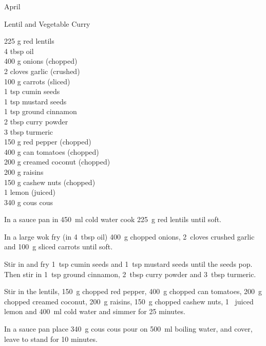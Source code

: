 \begin{menu}{April}
    \begin{recipe}{2}{Lentil and Vegetable Curry}%
		\begin{ingredients}
		225 g red lentils  \\
	4 tbsp oil  \\
	400 g onions (chopped) \\
	2 cloves garlic (crushed) \\
	100 g carrots (sliced) \\
	1 tsp cumin seeds  \\
	1 tsp mustard seeds  \\
	1 tsp ground cinnamon  \\
	2 tbsp curry powder  \\
	3 tbsp turmeric  \\
	150 g red pepper (chopped) \\
	400 g can tomatoes (chopped) \\
	200 g creamed coconut (chopped) \\
	200 g raisins  \\
	150 g cashew nuts (chopped) \\
	1  lemon (juiced) \\
	340 g cous cous  \\
	
		\end{ingredients}
	
	
	
    \begin{instructions}
    \item 
        In a sauce pan in
        450~ml  cold water
        cook
        225~g  red lentils
        until soft.
      \item 
        In a large wok fry
        (in 4~tbsp  oil)
        400~g chopped onions,
        2~cloves crushed garlic
        and
        100~g sliced carrots
        until soft.
      \item 
        Stir in and fry
        1~tsp  cumin seeds
        and
        1~tsp  mustard seeds
        until the seeds pop.
        Then stir in
        1~tsp  ground cinnamon,
        2~tbsp  curry powder
        and
        3~tbsp  turmeric.
      \item 
        Stir in
        the lentils,
        150~g chopped red pepper,
        400~g chopped can tomatoes,
        200~g chopped creamed coconut,
        200~g  raisins,
        150~g chopped cashew nuts,
        1~ juiced lemon
        and
        400~ml  cold water
        and simmer for 25 minutes.
      \item 
    In a
    sauce pan 
    place
    340~g  cous cous
    pour on
    500~ml  boiling water,
    and cover, leave to stand for 10 minutes.
  

\end{instructions}
\end{recipe}
\end{menu}
